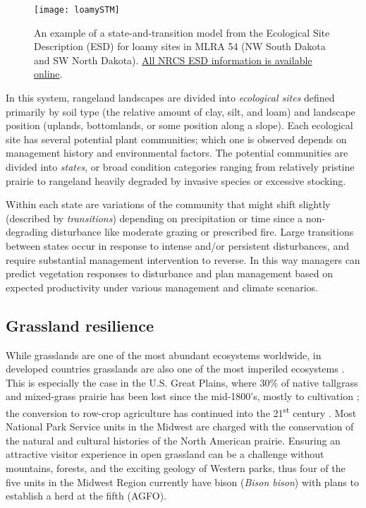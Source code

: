 \begin{figure}[!t]
	\center
	\texttt{[image: loamySTM]}
	\caption[State-and-transition model for loamy sites, MLRA 54]{An example of a state-and-transition model from the Ecological Site Description (ESD) for loamy sites in MLRA 54 (NW South Dakota and SW North Dakota). \href{https://esis.sc.egov.usda.gov/Welcome/pgReportLocation.aspx?type=ESD}{\textcolor{BisonGreen}{All NRCS ESD information is available online}}.}
	\label{fig:STM}
\end{figure}

In this system, rangeland landscapes are divided into \emph{ecological sites} defined primarily by soil type (the relative amount of clay, silt, and loam) and landscape position (uplands, bottomlands, or some position along a slope). 
Each ecological site has several potential plant communities; which one is observed depends on management history and environmental factors. 
The potential communities are divided into \emph{states}, or broad condition categories ranging from relatively pristine prairie to  rangeland heavily degraded by invasive species or excessive stocking. 

Within each state are variations of the community that might shift slightly (described by \emph{transitions}) depending on precipitation or time since a non-degrading disturbance like moderate grazing or prescribed fire. 
Large transitions between states occur in response to intense and/or persistent disturbances, and require substantial management intervention to reverse.
In this way managers can predict vegetation responses to disturbance and plan management based on expected productivity under various management and climate scenarios.

\subsection{Grassland resilience}\label{ssec:resilience}

While grasslands are one of the most abundant ecosystems worldwide, in developed countries grasslands are also one of the most imperiled ecosystems \citep{blair2014, newbold2016}.
This is especially the case in the U.S. Great Plains, where 30\% of native tallgrass and mixed-grass prairie has been lost since the mid-1800's, mostly to cultivation \citep{samson1994}; the conversion to row-crop agriculture has continued into the 21\textsuperscript{st} century \citep{wright2013}. 
Most National Park Service units in the Midwest are charged with the conservation of the natural and cultural histories of the North American prairie.
Ensuring an attractive visitor experience in open grassland can be a challenge without mountains, forests, and the exciting geology of Western parks, thus four of the five units in the Midwest Region currently have bison (\emph{Bison bison}) with plans to establish a herd at the fifth (AGFO). 

